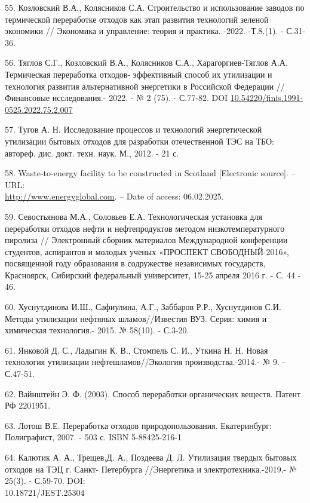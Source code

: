 \begin{references}
55. Козловский В.А., Колясников С.А. Строительство и использование
заводов по термической переработке отходов как этап развития технологий
зеленой экономики // Экономика и управление: теория и практика. -2022.
-Т.8.(1). - С.31-36.

56. Тяглов С.Г., Козловский В.А., Колясников С.А., Харагоргиев-Тяглов
А.А. Термическая переработка отходов- эффективный способ их утилизации и
технология развития альтернативной энергетики в Российской Федерации //
Финансовые исследования.- 2022. - № 2 (75). - С.77-82. DOI
\href{https://doi.org/10.54220/finis.1991-0525.2022.75.2.007}{10.54220/finis.1991-0525.2022.75.2.007}

57. Тугов А. Н. Исследование процессов и технологий энергетической
утилизации бытовых отходов для разработки отечественной ТЭС на ТБО:
автореф. дис. докт. техн. наук. М., 2012. - 21 с.

58. Waste-to-energy facility to be constructed in Scotland {[}Electronic
source{]}. -- URL:\\
\href{http://www.energyglobal.com/other-renewables/27102021/waste-to-energy-facility-to-be-constructed-in-scotland}{http://www.energyglobal.com}.
-- Date of access: 06.02.2025.

59. Севостьянова М.А., Соловьев Е.А. Технологическая установка для
переработки отходов нефти и нефтепродуктов методом низкотемпературного
пиролиза // Электронный сборник материалов Международной конференции
студентов, аспирантов и молодых ученых «ПРОСПЕКТ СВОБОДНЫЙ-2016»,
посвященной году образования в содружестве независимых государств,
Красноярск, Сибирский федеральный университет, 15-25 апреля 2016 г. - С.
44 - 46.

60. Хуснутдинова И.Ш., Сафиулина, А.Г., Заббаров Р.Р., Хуснутдинов С.И.
Методы утилизации нефтя­ных шламов//Известия ВУЗ. Серия: химия и
химическая технология.- 2015. № 58(10). - С.3-20.

61. Янковой Д. С., Ладыгин К. В., Стомпель С. И., Уткина Н. Н. Новая
технология утилизации нефтеш­ламов//Экология производства.-2014.- № 9. -
С.47-51.

62. Вайнштейн Э. Ф. (2003). Способ переработки органических веществ.
Патент РФ 2201951.

63. Лотош В.Е. Переработка отходов природопользования. Екатеринбург:
Полиграфист, 2007. - 503 с. ISBN 5-88425-216-1

64. Калютик А. А., Трещев,Д. А., Поздеева Д. Л. Утилизация твердых
бытовых отходов на ТЭЦ г. Санкт- Петербурга //Энергетика и
электротехника.-2019.- № 25(3). - С.59-70. DOI: \\10.18721/JEST.25304


\end{references}
